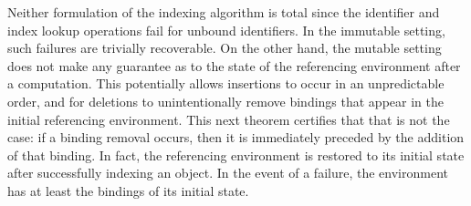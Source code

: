 Neither formulation of the indexing algorithm is total since the identifier and index lookup operations fail for unbound identifiers.
In the immutable setting, such failures are trivially recoverable.
On the other hand, the mutable setting does not make any guarantee as to the state of the referencing environment after a computation.
This potentially allows insertions to occur in an unpredictable order, and for deletions to unintentionally remove bindings that appear in the initial referencing environment.
This next theorem certifies that that is not the case: if a binding removal occurs, then it is immediately preceded by the addition of that binding.
In fact, the referencing environment is restored to its initial state after successfully indexing an \LF object.
In the event of a failure, the environment has at least the bindings of its initial state.

\newcommand{\D}{\mathcal{D}}
\newcommand{\E}{\mathcal{E}}

